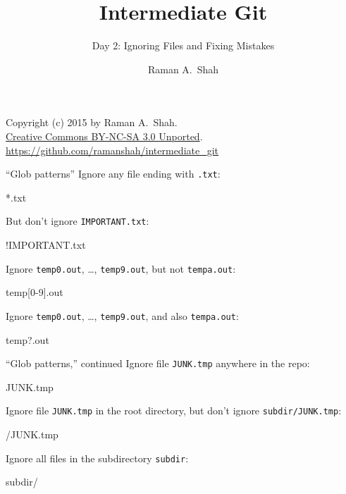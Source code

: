 

\title{Intermediate Git}
\subtitle{Day 2: Ignoring Files and Fixing Mistakes}
\author{Raman A.~Shah}
\date{}



\begin{frame}[plain]
  \titlepage
  \footnotesize{Copyright (c) 2015 by Raman A.~Shah.\\
  \href{https://creativecommons.org/licenses/by-nc-sa/3.0/legalcode}
       {Creative Commons BY-NC-SA 3.0 Unported}.\\
   \href{https://github.com/ramanshah/intermediate\_git}
        {https://github.com/ramanshah/intermediate\_git}}
\end{frame}

\begin{frame}[fragile]{``Glob patterns''}
  Ignore any file ending with \texttt{.txt}:

  \begin{gitCommand}*.txt\end{gitCommand}

  But don't ignore \texttt{IMPORTANT.txt}:

  \begin{gitCommand}!IMPORTANT.txt\end{gitCommand}

  Ignore \texttt{temp0.out}, \ldots, \texttt{temp9.out}, but not
  \texttt{tempa.out}:

  \begin{gitCommand}temp[0-9].out\end{gitCommand}

  Ignore \texttt{temp0.out}, \ldots, \texttt{temp9.out}, and also
  \texttt{tempa.out}:

  \begin{gitCommand}temp?.out\end{gitCommand}
\end{frame}

\begin{frame}[fragile]{``Glob patterns,'' continued}
  Ignore file \texttt{JUNK.tmp} anywhere in the repo:

  \begin{gitCommand}JUNK.tmp\end{gitCommand}

  Ignore file \texttt{JUNK.tmp} in the root directory, but don't ignore
  \texttt{subdir/JUNK.tmp}:

  \begin{gitCommand}/JUNK.tmp\end{gitCommand}

  Ignore all files in the subdirectory \texttt{subdir}:

  \begin{gitCommand}subdir/\end{gitCommand}
\end{frame}


